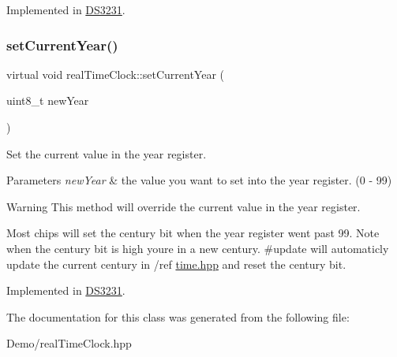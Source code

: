 Implemented in \mbox{\hyperlink{class_d_s3231_ac73512cc6c2a37ffb21bee74ea835a09}{D\+S3231}}.

\mbox{\label{classreal_time_clock_a4d6e8056f52cea52bab5c635c0860c12}} 
\subsubsection{\texorpdfstring{set\+Current\+Year()}{setCurrentYear()}}
{\footnotesize\ttfamily virtual void real\+Time\+Clock\+::set\+Current\+Year (\begin{DoxyParamCaption}\item[{uint8\+\_\+t}]{new\+Year }\end{DoxyParamCaption})\hspace{0.3cm}{\ttfamily [pure virtual]}}



Set the current value in the year register. 


\begin{DoxyParams}{Parameters}
{\em new\+Year} & the value you want to set into the year register. (0 -\/ 99) \\
\hline
\end{DoxyParams}
\begin{DoxyWarning}{Warning}
This method will override the current value in the year register. 

Most chips will set the century bit when the year register went past 99. Note when the century bit is high you\textquotesingle{}re in a new century. \#update will automaticly update the current century in /ref \mbox{\hyperlink{time_8hpp_source}{time.\+hpp}} and reset the century bit. 
\end{DoxyWarning}


Implemented in \mbox{\hyperlink{class_d_s3231_a59a60a725581bc8e5dcf857ea52c6281}{D\+S3231}}.



The documentation for this class was generated from the following file\+:\begin{DoxyCompactItemize}
\item 
Demo/real\+Time\+Clock.\+hpp\end{DoxyCompactItemize}
